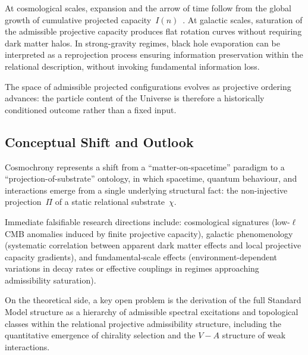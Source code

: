   At cosmological scales, expansion and the arrow of time follow from the
  global growth of cumulative projected capacity~$I(n)$~\cite{Beau2026pto}.
  At galactic scales, saturation of the admissible projective capacity produces
  flat rotation curves without requiring dark matter halos.
  In strong-gravity regimes, black hole evaporation can be interpreted as
  a reprojection process ensuring information preservation within the
  relational description, without invoking fundamental information loss.

  The space of admissible projected configurations evolves as projective
  ordering advances: the particle content of the Universe is therefore a
  historically conditioned outcome rather than a fixed input.

  \subsection*{Conceptual Shift and Outlook}

    Cosmochrony represents a shift from a ``matter-on-spacetime'' paradigm
    to a ``projection-of-substrate'' ontology, in which spacetime,
    quantum behaviour, and interactions emerge from a single underlying
    structural fact: the non-injective projection~$\Pi$ of a static
    relational substrate~$\chi$.

    Immediate falsifiable research directions include:
    cosmological signatures (low-$\ell$ CMB anomalies induced by finite projective
    capacity), galactic phenomenology (systematic correlation between apparent
    dark matter effects and local projective capacity gradients), and
    fundamental-scale effects (environment-dependent variations in decay rates
    or effective couplings in regimes approaching admissibility saturation).

    On the theoretical side, a key open problem is the derivation of the full
    Standard Model structure as a hierarchy of admissible spectral excitations
    and topological classes within the relational projective admissibility
    structure, including the quantitative emergence of chirality selection and
    the $V{-}A$ structure of weak interactions.
